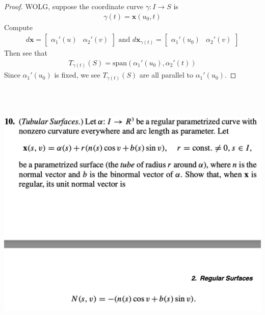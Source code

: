 \documentclass{report}
\begin{document}
\begin{proof}
WOLG, suppose the coordinate curve $\gamma :I\rightarrow S$ is  
\begin{align*}
\gamma  (t)=\textbf{x}(u_0,t)
\end{align*}
Compute 
\begin{align*}
d\textbf{x}=\begin{bmatrix}
  \alpha_1' (u) & \alpha _2'(v)
\end{bmatrix}\text{ and }d\textbf{x}_{\gamma (t)}=\begin{bmatrix}
  \alpha_1'(u_0)& \alpha_2'(v)
\end{bmatrix}
\end{align*}
Then see that 
\begin{align*}
T_{\gamma (t)} (S)=\text{span}(\alpha_1'(u_0),\alpha_2'(t))
\end{align*}
Since $\alpha_1'(u_0)$ is fixed, we see $T_{\gamma (t) }(S)$ are all parallel to $\alpha_1'(u_0)$. 
\end{proof}
\begin{question}{}{}
\includegraphics[height=13cm,width=18cm]{hw4q3}
\end{question}
\end{document}
